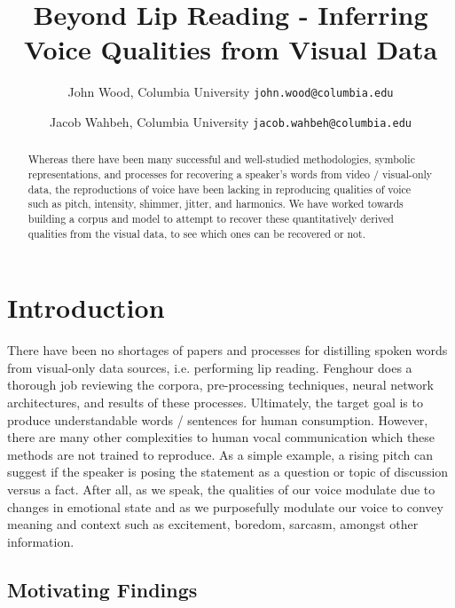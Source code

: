 \documentclass[10pt,twocolumn,letterpaper]{article}
\begin{document}
\title{Beyond Lip Reading - Inferring Voice Qualities from Visual Data}

\author{John Wood, 
Columbia University
{\tt\small john.wood@columbia.edu}
\and Jacob Wahbeh,
Columbia University
{\tt\small jacob.wahbeh@columbia.edu}
}
\maketitle

\begin{abstract}
   Whereas there have been many successful and well-studied methodologies, symbolic representations, and processes for recovering a speaker's words from video / visual-only data, the reproductions of voice have been lacking in reproducing qualities of voice such as pitch, intensity, shimmer, jitter, and harmonics. We have worked towards building a corpus and model to attempt to recover these quantitatively derived qualities from the visual data, to see which ones can be recovered or not.
\end{abstract}

\section{Introduction}
\label{sec:intro}

There have been no shortages of papers and processes for distilling spoken words from visual-only data sources, i.e. performing lip reading. Fenghour  \cite{Fenghour2021} does a thorough job reviewing the corpora, pre-processing techniques, neural network architectures, and results of these processes. Ultimately, the target goal is to produce understandable words / sentences for human consumption. However, there are many other complexities to human vocal communication which these methods are not trained to reproduce. As a simple example, a rising pitch can suggest if the speaker is posing the statement as a question or topic of discussion versus a fact. After all, as we speak, the qualities of our voice modulate due to changes in emotional state and as we purposefully modulate our voice to convey meaning and context such as excitement, boredom, sarcasm, amongst other information.

\subsection{Motivating Findings}
\end{document}
